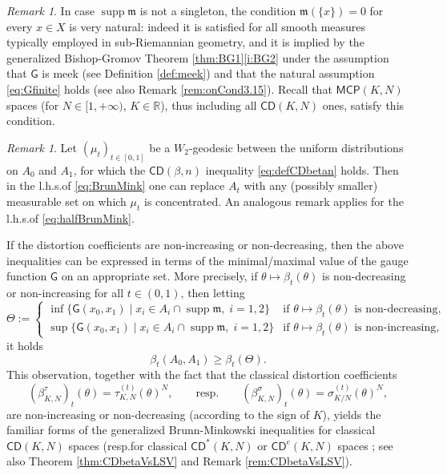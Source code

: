 \documentclass[11pt,a4paper]{article}
\theoremstyle{plain}
\theoremstyle{definition}
\theoremstyle{remark}
\newtheorem{remark}[theorem]{Remark}
\numberwithin{equation}{section}
\newcommand{\R}{\mathbb{R}} %
\DeclareMathOperator{\supp}{\mathrm{supp}}
\newcommand{\CD}{\mathsf{CD}}
\newcommand{\MCP}{\mathsf{MCP}}
\newcommand{\mm}{\mathfrak m}
\newcommand{\sfG}{\mathsf G}
\begin{document}
\begin{remark}
In case  $\supp \mm$ is not a singleton, the condition  $\mm(\{x\})=0$ for every $x\in X$ is very natural: indeed it is satisfied for all smooth measures typically employed in sub-Riemannian geometry, and it is implied by the generalized Bishop-Gromov Theorem \ref{thm:BG1}\ref{i:BG2} under the assumption that $\sfG$ is meek (see Definition \ref{def:meek}) and that the natural assumption \eqref{eq:Gfinite} holds (see also Remark \ref{rem:onCond3.15}). Recall that $\MCP(K,N)$ spaces (for $N\in [1,+\infty)$, $K\in \R$), thus including all $\CD(K,N)$ ones, satisfy this condition. 
\end{remark}


\begin{remark}\label{rmk:concentratedimprove}
Let $(\mu_t)_{t\in [0,1]}$ be a $W_2$-geodesic between the uniform distributions on $A_0$ and $A_1$, for which the $\CD(\beta,n)$ inequality \eqref{eq:defCDbetan} holds. Then in the l.h.s.\@ of \eqref{eq:BrunMink} one can replace $A_t$ with any (possibly smaller) measurable set on which $\mu_t$ is concentrated. An analogous remark applies for the l.h.s.\@ of \eqref{eq:halfBrunMink}.
\end{remark}


If the distortion coefficients are non-increasing or non-decreasing, then the above inequalities can be expressed in terms of the minimal/maximal value of the gauge function $\sfG$ on an appropriate set. More precisely, if $\theta\mapsto\beta_t(\theta)$ is non-decreasing or non-increasing for all $t\in (0,1)$, then letting
\begin{equation}\label{eq:defTheta}
\Theta:=
\begin{cases}
\inf\{\sfG(x_{0},x_{1}) \mid x_i \in A_i\cap\supp\mm,\; i=1,2 \} & \text{if  $\theta\mapsto \beta_{t}(\theta)$ is non-decreasing}, \\
\sup\{ \sfG(x_{0},x_{1})\mid x_i \in A_i\cap\supp\mm,\; i=1,2 \} & \text{if  $\theta\mapsto \beta_{t}(\theta)$ is non-increasing},
\end{cases}
\end{equation}
it holds 
\begin{equation}
\beta_t(A_0,A_1) \geq \beta_t(\Theta).
\end{equation}
This observation, together with the fact that the classical distortion coefficients 
\begin{equation}
(\beta_{K,N}^\tau)_t(\theta) = \tau_{K,N}^{(t)}(\theta)^N, \qquad \text{resp.} \qquad (\beta_{K,N}^\sigma)_t(\theta) = \sigma_{K/N}^{(t)}(\theta)^N,
\end{equation}
are non-increasing or non-decreasing (according to the sign of $K$), yields the familiar forms of the generalized Brunn-Minkowski inequalities for classical $\CD(K,N)$  spaces \cite{sturm:II} (resp.\@ for classical $\CD^{*}(K,N)$ or $\CD^{e}(K,N)$ spaces \cite{BS10, EKS}; see also Theorem \ref{thm:CDbetaVsLSV} and Remark \ref{rem:CDbetaVsLSV}).
\end{document}
